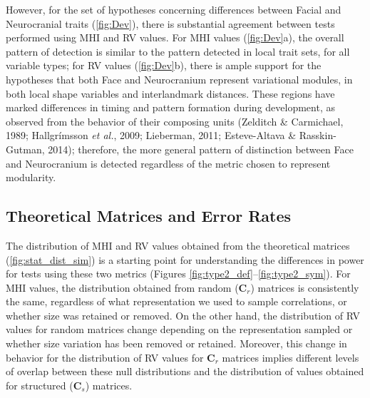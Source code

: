 \documentclass[12pt,twoside]{report}
\begin{document}
However, for the set of hypotheses concerning differences between Facial
and Neurocranial traits (\autoref{fig:Dev}), there is substantial
agreement between tests performed using MHI and RV values. For MHI
values (\autoref{fig:Dev}a), the overall pattern of detection is similar
to the pattern detected in local trait sets, for all variable types; for
RV values (\autoref{fig:Dev}b), there is ample support for the
hypotheses that both Face and Neurocranium represent variational
modules, in both local shape variables and interlandmark distances.
These regions have marked differences in timing and pattern formation
during development, as observed from the behavior of their composing
units (Zelditch \& Carmichael, 1989; Hallgrímsson \emph{et al.}, 2009;
Lieberman, 2011; Esteve-Altava \& Rasskin-Gutman, 2014); therefore, the
more general pattern of distinction between Face and Neurocranium is
detected regardless of the metric chosen to represent modularity.

\subsection{Theoretical Matrices and Error
Rates}\label{theoretical-matrices-and-error-rates}

The distribution of MHI and RV values obtained from the theoretical
matrices (\autoref{fig:stat_dist_sim}) is a starting point for
understanding the differences in power for tests using these two metrics
(Figures \ref{fig:type2_def}--\ref{fig:type2_sym}). For MHI values, the
distribution obtained from random ($\mathbf{C}_r$) matrices is
consistently the same, regardless of what representation we used to
sample correlations, or whether size was retained or removed. On the
other hand, the distribution of RV values for random matrices change
depending on the representation sampled or whether size variation has
been removed or retained. Moreover, this change in behavior for the
distribution of RV values for $\mathbf{C}_r$ matrices implies different
levels of overlap between these null distributions and the distribution
of values obtained for structured ($\mathbf{C}_s$) matrices.
\end{document}
